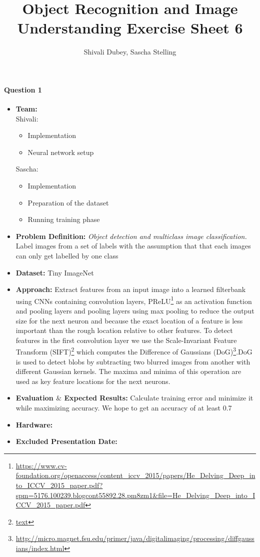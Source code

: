 \documentclass[10pt,a4]{article}
\author{Shivali Dubey, Sascha Stelling}
\title{Object Recognition and Image Understanding Exercise Sheet 6}
\begin{document}
\maketitle

\paragraph{Question 1}
\begin{itemize}
	\item \textbf{Team:} \\Shivali:
	\begin{itemize}
		\item Implementation
		\item Neural network setup
	\end{itemize}
	Sascha:
	\begin{itemize}
		\item Implementation
		\item Preparation of the dataset
		\item Running training phase
	\end{itemize}
	\item \textbf{Problem Definition:} \textit{Object detection and multiclass image classification.}
	\\Label images from a set of labels with the assumption that that each images can only get labelled by one class
	\item \textbf{Dataset:} Tiny ImageNet
	\item \textbf{Approach:} Extract features from an input image into a learned filterbank using CNNs containing convolution layers,  PReLU\footnote{\url{https://www.cv-foundation.org/openaccess/content_iccv_2015/papers/He_Delving_Deep_into_ICCV_2015_paper.pdf?spm=5176.100239.blogcont55892.28.pm8zm1&file=He_Delving_Deep_into_ICCV_2015_paper.pdf}} as an activation function and pooling layers and pooling layers using max pooling to reduce the output size for the next neuron and because the exact location of a feature is less important than the rough location relative to other features. 
	To detect features in the first convolution layer we use the Scale-Invariant Feature Transform (SIFT)\footnote{\url{text}} which computes the Difference of Gaussians (DoG)\footnote{\url{http://micro.magnet.fsu.edu/primer/java/digitalimaging/processing/diffgaussians/index.html}}.DoG is used to detect blobs by subtracting two blurred images from another with different Gaussian kernels. The maxima and minima of this operation are used as key feature locations for the next neurons.
	\item \textbf{Evaluation $\mathbf{\&}$ Expected  Results:} Calculate training error and minimize it while maximizing accuracy. We hope to get an accuracy of at least 0.7
	\item \textbf{Hardware:}
	\item \textbf{Excluded Presentation Date:}	
\end{itemize}
\end{document}
